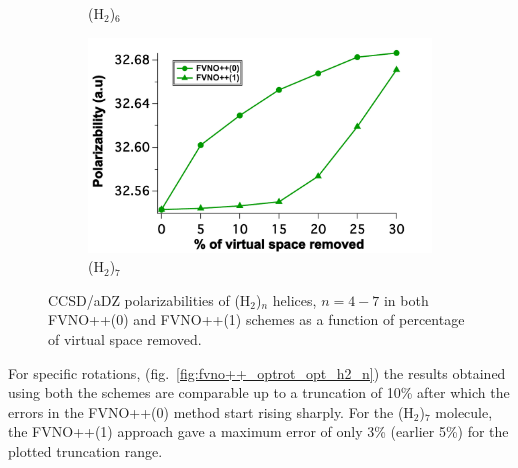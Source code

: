 \begin{figure}
\begin{subfigure}{.5\textwidth}
  \caption{(H$_2$)$_6$}
  \label{fig:sfig2}
\end{subfigure}
\begin{subfigure}{.5\textwidth}
  \centering
  \includegraphics[width=.9\linewidth]{figures_fvno++/fvno++_cc2_1_h2_7_adz_polar.pdf}
  \caption{(H$_2$)$_7$}
  \label{fig:sfig2}
\end{subfigure}
\caption{{\footnotesize CCSD/aDZ polarizabilities of
(H$_2$)$_n$ helices, $ n = 4-7$ in both FVNO++(0) and FVNO++(1) schemes as a function of
percentage of virtual space removed.}}
\label{fig:fvno++_polar_opt_h2_n}
\end{figure}
For specific rotations, (fig.~\ref{fig:fvno++_optrot_opt_h2_n}) the results obtained 
using both the schemes are comparable up to a truncation of 10\% after which the errors in the FVNO++(0) 
method start rising sharply. For the (H$_2$)$_7$ molecule, the FVNO++(1) approach gave a maximum error of only 3\% (earlier 5\%) 
for the plotted truncation range.
